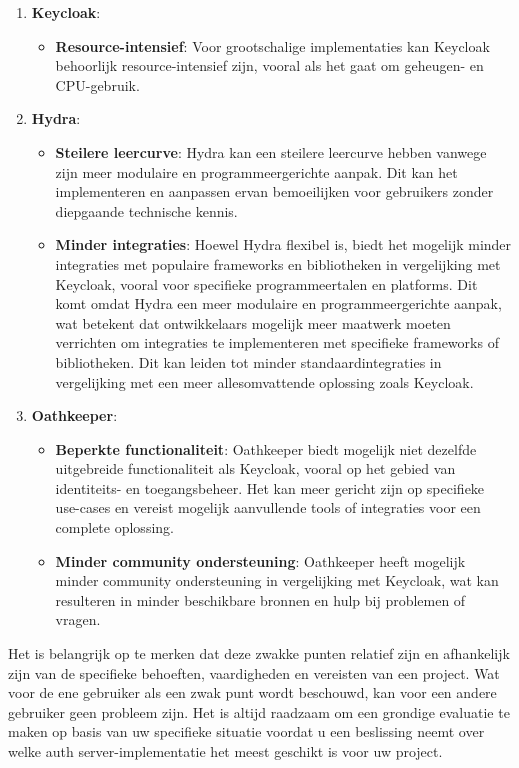 \begin{enumerate}[label=\textbf{\arabic*.}]
    \item \textbf{Keycloak}:
    \begin{itemize}
        \item \textbf{Resource-intensief}: Voor grootschalige implementaties kan Keycloak behoorlijk resource-intensief zijn, vooral als het gaat om geheugen- en CPU-gebruik.
    \end{itemize}

    \item \textbf{Hydra}:
    \begin{itemize}
        \item \textbf{Steilere leercurve}: Hydra kan een steilere leercurve hebben vanwege zijn meer modulaire en programmeergerichte aanpak. Dit kan het implementeren en aanpassen ervan bemoeilijken voor gebruikers zonder diepgaande technische kennis.
        \item \textbf{Minder integraties}: Hoewel Hydra flexibel is, biedt het mogelijk minder integraties met populaire frameworks en bibliotheken in vergelijking met Keycloak, vooral voor specifieke programmeertalen en platforms. Dit komt omdat Hydra een meer modulaire en programmeergerichte aanpak, wat betekent dat ontwikkelaars mogelijk meer maatwerk moeten verrichten om integraties te implementeren met specifieke frameworks of bibliotheken. Dit kan leiden tot minder standaardintegraties in vergelijking met een meer allesomvattende oplossing zoals Keycloak.
    \end{itemize}
    
    \item \textbf{Oathkeeper}:
    \begin{itemize}
        \item \textbf{Beperkte functionaliteit}: Oathkeeper biedt mogelijk niet dezelfde uitgebreide functionaliteit als Keycloak, vooral op het gebied van identiteits- en toegangsbeheer. Het kan meer gericht zijn op specifieke use-cases en vereist mogelijk aanvullende tools of integraties voor een complete oplossing.
        \item \textbf{Minder community ondersteuning}: Oathkeeper heeft mogelijk minder community ondersteuning in vergelijking met Keycloak, wat kan resulteren in minder beschikbare bronnen en hulp bij problemen of vragen.
    \end{itemize}
\end{enumerate}

Het is belangrijk op te merken dat deze zwakke punten relatief zijn en afhankelijk zijn van de specifieke behoeften, vaardigheden en vereisten van een project. Wat voor de ene gebruiker als een zwak punt wordt beschouwd, kan voor een andere gebruiker geen probleem zijn. Het is altijd raadzaam om een grondige evaluatie te maken op basis van uw specifieke situatie voordat u een beslissing neemt over welke \gls{auth} server-implementatie het meest geschikt is voor uw project.

